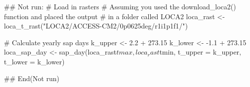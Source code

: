 %
\begin{Examples}
\begin{ExampleCode}
## Not run: 
# Load in rasters
# Assuming you used the download_loca2() function and placed the output
# in a folder called LOCA2
loca_rast <- loca_t_rast("LOCA2/ACCESS-CM2/0p0625deg/r1i1p1f1/")

# Calculate yearly sap days
k_upper <- 2.2 + 273.15
k_lower <- -1.1 + 273.15
loca_sap_day <- sap_day(loca_rast$tmax, loca_rast$tmin,
                        t_upper = k_upper, t_lower = k_lower)

## End(Not run)
\end{ExampleCode}
\end{Examples}

